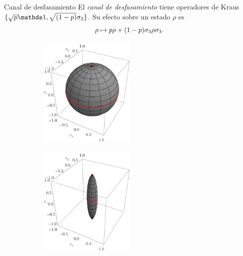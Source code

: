 \begin{frame}{Canal de desfasamiento}
    El \textit{canal de desfasamiento} tiene operadores de Kraus $\{\sqrt{p}\Id,\sqrt{(1-p)}\pauli{3}\}$. Su efecto sobre un estado $\rho$ es
    \begin{equation}
        \rho\mapsto p\rho+(1-p)\sigma_{3}\rho\sigma_{3}.\nonumber
    \end{equation}
    \begin{figure}
        \centering
        \begin{subfigure}{0.45\textwidth}
            \centering
            \includegraphics[width=0.5\textwidth]{figures/whole_sphere.png}
        \end{subfigure}
        \begin{subfigure}{0.45\textwidth}
            \centering
            \includegraphics[width=0.5\textwidth]{figures/dephased.png}
        \end{subfigure}
    \end{figure}
\end{frame}

